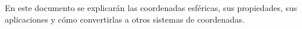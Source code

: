 En este documento se explicarán las coordenadas esféricas, sus propiedades, sus aplicaciones y cómo convertirlas a otros sistemas de coordenadas.
